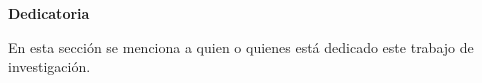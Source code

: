 \thispagestyle{plain}
\begin{center}
    \Large    
    \vspace{0.9cm}
    \textbf{Dedicatoria}
\end{center}
En esta sección se menciona a quien o quienes está dedicado este trabajo de investigación.